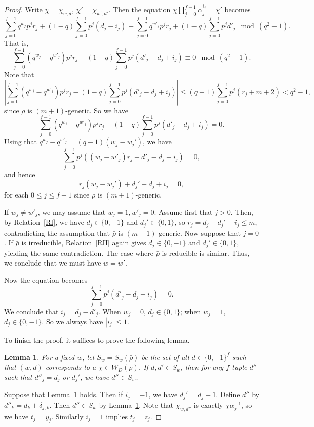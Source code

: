 \documentclass{article}
\newtheorem{lemma}[definition]{Lemma}
\numberwithin{equation}{section}
\begin{document}
\begin{proof}
    Write $\chi=\chi_{w,d}$, $\chi'=\chi_{w',d'}$. Then the equation $\chi\prod_{j=0}^{f-1}\alpha_j^{i_j}=\chi'$ becomes 
    $$\sum_{j=0}^{f-1}q^{w_j}p^jr_j+(1-q)\sum_{j=0}^{f-1}p^j(d_j-i_j)\equiv\sum_{j=0}^{f-1}q^{w'_j}p^jr_j+(1-q)\sum_{j=0}^{f-1}p^jd'_j\mod(q^2-1).$$
    That is, 
    $$\sum_{j=0}^{f-1}(q^{w_j}-q^{w'_j})p^jr_j- (1-q)\sum_{j=0}^{f-1}p^j(d'_j-d_j+i_j)\equiv 0\mod(q^2-1).$$
    Note that
    $$|\sum_{j=0}^{f-1}(q^{w_j}-q^{w'_j})p^jr_j- (1-q)\sum_{j=0}^{f-1}p^j(d'_j-d_j+i_j)|\leq (q-1)\sum_{j=0}^{f-1}p^j(r_j+m+2)<q^2-1,$$ 
    since $\bar{\rho}$ is $(m+1)$-generic. So we have 
    $$\sum_{j=0}^{f-1}(q^{w_j}-q^{w'_j})p^jr_j- (1-q)\sum_{j=0}^{f-1}p^j(d'_j-d_j+i_j)=0.$$
    Using that $q^{w_j}-q^{w'_j}=(q-1)(w_j-w_j')$, we have 
    $$\sum_{j=0}^{f-1}p^j((w_j-w'_j)r_j+d'_j-d_j+i_j)=0,$$
    and hence 
    $$r_j(w_j-w_j')+d_j'-d_j+i_j=0,$$
    for each $0\leq j\leq f-1$ since $\bar{\rho}$ is $(m+1)$-generic. 
    
    If $w_j\ne w'_j$, 
    we may assume that $w_{j}=1, w'_{j}=0$.
    Assume first that $j>0$. Then, by Relation~\ref{RI}, we have $d_j\in\{0,-1\}$ and $d_j'\in\{0,1\}$, 
    so $r_j=d_j-d_j'-i_j\leq m$, contradicting the assumption that $\bar{\rho}$ is $(m+1)$-generic. 
    Now suppose that $j=0$. If $\bar{\rho}$ is irreducible, 
    Relation~\ref{RII} again gives $d_j\in\{0,-1\}$ and $d_j'\in\{0,1\}$,
    yielding the same contradiction. 
    The case where $\bar{\rho}$ is reducible is similar. Thus, we conclude that we must have $w=w'$. 
    
    Now the equation becomes 
    $$\sum_{j=0}^{f-1}p^j(d'_j-d_j+i_j)=0.$$
    We conclude that $i_j=d_j-d'_j$. 
    When $w_j=0$, $d_{j}\in\{0,1\}$; when $w_j=1$, $d_j\in\{0,-1\}$. 
    So we always have $|i_j|\leq 1$. 

    To finish the proof, it suffices to prove the following lemma. 
    
    \begin{lemma}\label{convex-of-d}
    For a fixed $w$, let $S_w=S_w(\bar{\rho})$ be the set of all $d\in\{0,\pm1\}^f$ such that 
    $(w,d)$ corresponds to a $\chi\in W_{D}(\bar{\rho})$. 
    If $d,d'\in S_w$, then for any $f$-tuple $d''$ such that 
    $d''_j=d_j$ or $d_j'$, we have $d''\in S_w$. 
    \end{lemma}
    
    Suppose that Lemma~\ref{convex-of-d} holds. Then if $i_j=-1$, we have $d_j'=d_j+1$. 
    Define $d''$ by $d''_k=d_k+\delta_{j,k}$. Then $d''\in S_{w}$ by Lemma~\ref{convex-of-d}. 
    Note that $\chi_{w,d''}$ is exactly $\chi\alpha_j^{-1}$, so we have $t_j=y_j$. 
    Similarly $i_j=1$ implies $t_j=z_j$. 
\end{proof}
\end{document}
